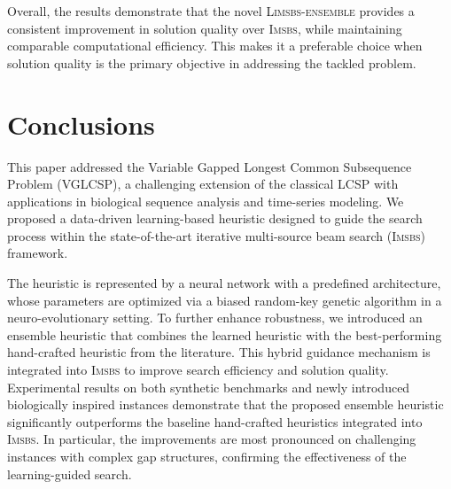 \documentclass[runningheads]{llncs}
\begin{document}
Overall, the results demonstrate that the novel \textsc{Limsbs-ensemble}   provides a consistent improvement in solution quality over \textsc{Imsbs}, while maintaining comparable computational efficiency. This makes it a preferable choice when solution quality is the primary objective in addressing the tackled problem.

 
\section{Conclusions}\label{sec:conclusions}

This paper addressed the Variable Gapped Longest Common Subsequence Problem (VGLCSP), a challenging extension of the classical LCSP with applications in biological sequence analysis and time-series modeling. We proposed a data-driven learning-based heuristic designed to guide the search process within the state-of-the-art iterative multi-source beam search (\textsc{Imsbs}) framework.

The heuristic is represented by a neural network with a predefined architecture, whose parameters are optimized via a biased random-key genetic algorithm in a neuro-evolutionary setting. To further enhance robustness, we introduced an ensemble heuristic that combines the learned heuristic with the best-performing hand-crafted heuristic from the literature. This hybrid guidance mechanism is integrated into \textsc{Imsbs} to improve search efficiency and solution quality. Experimental results on both synthetic benchmarks and newly introduced biologically inspired instances demonstrate that the proposed ensemble heuristic  significantly outperforms the baseline hand-crafted heuristics integrated into \textsc{Imsbs}. In particular, the improvements are most pronounced on challenging instances with complex gap structures, confirming the effectiveness of the learning-guided search.  %
\end{document}
